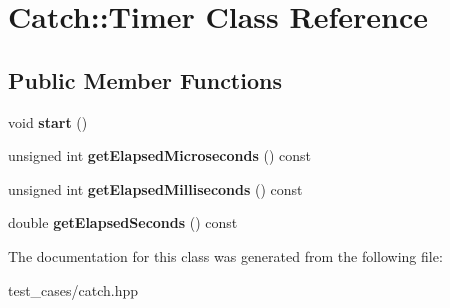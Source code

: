 \hypertarget{classCatch_1_1Timer}{}\section{Catch\+:\+:Timer Class Reference}
\label{classCatch_1_1Timer}
\subsection*{Public Member Functions}
\begin{DoxyCompactItemize}
\item 
\mbox{\label{classCatch_1_1Timer_a0a56e879e43f36c102bf9ea8b5fc8b72}} 
void {\bfseries start} ()
\item 
\mbox{\label{classCatch_1_1Timer_af592ca4a9d340b9855732e4af777eaf0}} 
unsigned int {\bfseries get\+Elapsed\+Microseconds} () const
\item 
\mbox{\label{classCatch_1_1Timer_a2081b2d36950ab6912e7c4958afe0099}} 
unsigned int {\bfseries get\+Elapsed\+Milliseconds} () const
\item 
\mbox{\label{classCatch_1_1Timer_ae1615c8a9aa44b7a96cfe8a35d34e5de}} 
double {\bfseries get\+Elapsed\+Seconds} () const
\end{DoxyCompactItemize}


The documentation for this class was generated from the following file\+:\begin{DoxyCompactItemize}
\item 
test\+\_\+cases/catch.\+hpp\end{DoxyCompactItemize}
